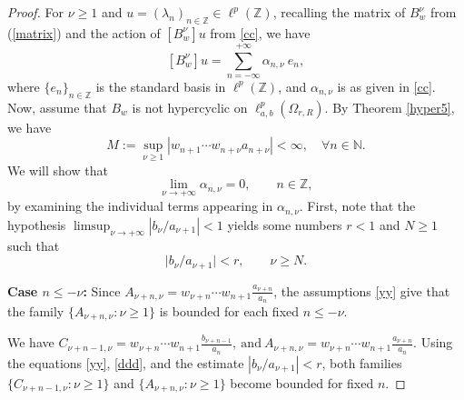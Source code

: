 \documentclass[10pt,a4paper]{amsart}
\begin{document}
\begin{proof}
 For $\nu\geq 1$ and $u=(\lambda_{n})_{n\in \mathbb{Z}}\in \ell^{p}(\mathbb{Z})$, recalling the matrix of $B_{w}^{\nu}$ from (\ref{matrix}) and the action of $[B_{w}^{\nu}]u$ from \eqref{cc}, we have
\begin{equation}\label{ccc}
   [B_{w}^{\nu}]u=\sum_{n=-\infty}^{+\infty} \alpha_{n,\nu} ~ e_{n},
\end{equation}
where $\{e_{n}\}_{n\in \mathbb{Z}}$ is the standard basis in $\ell^p(\mathbb{Z})$, and 
$\alpha_{n,\nu}$ is as given in \eqref{cc}.
Now, assume that $B_{w}$ is not hypercyclic on $\ell^p_{a,b}(\Omega_{r,R})$. By Theorem \ref{hyper5}, we have 
\begin{equation}\label{ddd}
M:=\sup_{\nu\geq 1}\left|w_{n+1}\cdots w_{n+\nu}{a_{n+\nu}}\right|<\infty,\quad\forall n\in \mathbb{N}.
\end{equation}
We will show that 
\[
\lim_{\nu\to+\infty}\alpha_{n,\nu}=0 , \qquad n\in\mathbb{Z},
\]
by examining the individual terms appearing in $\alpha_{n,\nu}$. First, note that the hypothesis $\limsup_{\nu\to+\infty}|b_\nu/a_{\nu+1}|<1$ yields some numbers $r<1$ and $N\geq 1$ such that  
\begin{equation}\label{dd}
\big|b_\nu/a_{\nu+1}\big|<r, \qquad \nu\geq N.
\end{equation}

\noindent \textbf{Case $n\le -\nu$:} Since $A_{\nu+n,\nu}
=w_{\nu+n}\cdots w_{n+1}\frac{a_{\nu+n}}{a_{n}}$, the assumptions \eqref{yy} give that the family $\{A_{\nu+n,\nu}:\nu\ge 1\}$ is bounded for each fixed $n\le -\nu$.

We have
$
C_{\nu+n-1,\nu}
   = w_{\nu+n}\cdots w_{n+1} \frac{b_{\nu+n-1}}{a_{n}},
~\text{and}~
A_{\nu+n,\nu}=
   w_{\nu+n}\cdots w_{n+1}\frac{a_{\nu+n}}{a_{n}}.
$
Using the equations \eqref{yy}, \eqref{ddd}, and the estimate 
$|b_\nu/a_{\nu+1}|<r$, both families
$
\{C_{\nu+n-1,\nu}:\nu\ge 1\}$ and 
$\{A_{\nu+n,\nu}:\nu\ge 1\}
$
become bounded for fixed $n$.


\end{proof}
\end{document}
